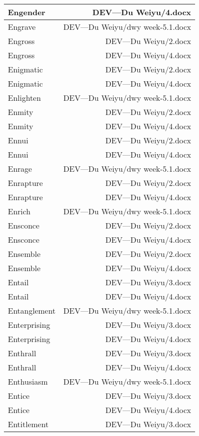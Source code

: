 \documentclass{article}
\begin{document}
\begin{center}
\begin{longtable}{|l|r|}
\hline
Engender  &  DEV---Du Weiyu/4.docx\\  
\hline
Engrave  &  DEV---Du Weiyu/dwy week-5.1.docx\\  
\hline
Engross  &  DEV---Du Weiyu/2.docx\\  
\hline
Engross  &  DEV---Du Weiyu/4.docx\\  
\hline
Enigmatic  &  DEV---Du Weiyu/2.docx\\  
\hline
Enigmatic  &  DEV---Du Weiyu/4.docx\\  
\hline
Enlighten  &  DEV---Du Weiyu/dwy week-5.1.docx\\  
\hline
Enmity  &  DEV---Du Weiyu/2.docx\\  
\hline
Enmity  &  DEV---Du Weiyu/4.docx\\  
\hline
Ennui  &  DEV---Du Weiyu/2.docx\\  
\hline
Ennui  &  DEV---Du Weiyu/4.docx\\  
\hline
Enrage  &  DEV---Du Weiyu/dwy week-5.1.docx\\  
\hline
Enrapture  &  DEV---Du Weiyu/2.docx\\  
\hline
Enrapture  &  DEV---Du Weiyu/4.docx\\  
\hline
Enrich  &  DEV---Du Weiyu/dwy week-5.1.docx\\  
\hline
Ensconce  &  DEV---Du Weiyu/2.docx\\  
\hline
Ensconce  &  DEV---Du Weiyu/4.docx\\  
\hline
Ensemble  &  DEV---Du Weiyu/2.docx\\  
\hline
Ensemble  &  DEV---Du Weiyu/4.docx\\  
\hline
Entail  &  DEV---Du Weiyu/3.docx\\  
\hline
Entail  &  DEV---Du Weiyu/4.docx\\  
\hline
Entanglement  &  DEV---Du Weiyu/dwy week-5.1.docx\\  
\hline
Enterprising  &  DEV---Du Weiyu/3.docx\\  
\hline
Enterprising  &  DEV---Du Weiyu/4.docx\\  
\hline
Enthrall  &  DEV---Du Weiyu/3.docx\\  
\hline
Enthrall  &  DEV---Du Weiyu/4.docx\\  
\hline
Enthusiasm  &  DEV---Du Weiyu/dwy week-5.1.docx\\  
\hline
Entice  &  DEV---Du Weiyu/3.docx\\  
\hline
Entice  &  DEV---Du Weiyu/4.docx\\  
\hline
Entitlement  &  DEV---Du Weiyu/3.docx\\  

\end{longtable}
\end{center}
\end{document}
